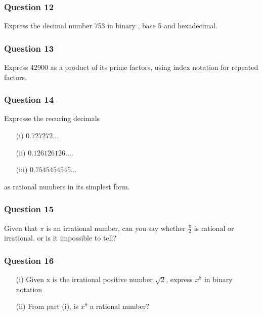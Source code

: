 \documentclass[]{report}
\begin{document}
	\subsubsection*{Question 12}
	
	Express the decimal number 753 in binary , base 5 and hexadecimal.
	
	\subsubsection*{Question 13}
	
	Express 42900 as a product of its prime factors, using index notation for repeated factors.
	
	\subsubsection*{Question 14}
	
	Expresse the recuring decimals 
	\begin{itemize}
		\item[(i)] $0.727272\ldots$
		\item[(ii)] $0.126126126....$
		\item[(iii)] $0.7545454545...$
	\end{itemize} 
	as rational numbers in its simplest form.
	
	\subsubsection*{Question 15}
	Given that $\pi$ is an irrational number, can you say whether $\frac{\pi}{2}$ is rational or irrational.
	or is it impossible to tell?
	
	\subsubsection*{Question 16}
	\begin{itemize}
		\item[(i)] Given x is the irrational positive number $\sqrt{2}$, express $x^8$ in binary notation\\
		\item[(ii)] From part (i), is $x^8$ a rational number?
	\end{itemize}
	
\end{document}
